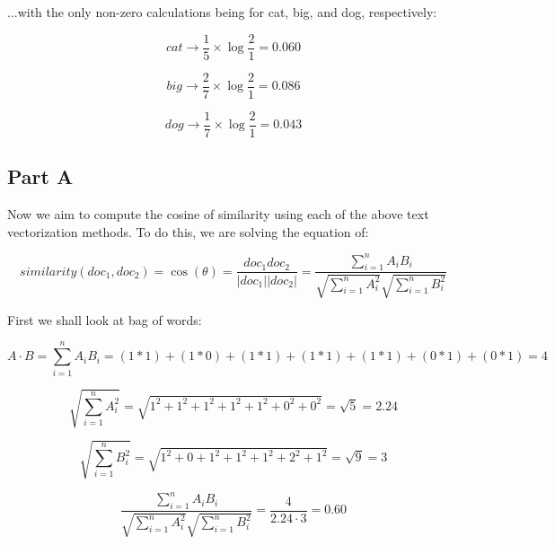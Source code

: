\documentclass{article}
\begin{document}
\noindent ...with the only non-zero calculations being for cat, big, and dog, respectively:

\begin{equation}
    cat \rightarrow \frac{1}{5} \times \log{\frac{2}{1}} = 0.060
\end{equation}

\begin{equation}
    big \rightarrow \frac{2}{7} \times \log{\frac{2}{1}} = 0.086
\end{equation}

\begin{equation}
    dog \rightarrow \frac{1}{7} \times \log{\frac{2}{1}} = 0.043
\end{equation}

\subsection*{Part A}

Now we aim to compute the cosine of similarity using each of the above text vectorization methods. To do this, we are solving the equation of:

\begin{equation}
    similarity(doc_1, doc_2) = \cos(\theta) = \frac{doc_1 doc_2}{\lvert doc_1 \rvert \lvert doc_2 \rvert} = \frac{\sum^n_{i=1} A_i B_i}{\sqrt{\sum^{n}_{i=1} A^2_i} \sqrt{\sum^n_{i=1} B^2_i}}
\end{equation}

\noindent First we shall look at bag of words:

\begin{equation}
    A \cdot B = \sum^n_{i=1} A_i B_i = (1*1) + (1*0) + (1*1) + (1*1) + (1*1) + (0*1) + (0*1) = 4
\end{equation}

\begin{equation}
    \sqrt{\sum^n_{i=1} A_i^2 } = \sqrt{1^2 + 1^2 + 1^2 + 1^2 + 1^2 + 0^2 + 0^2} = \sqrt{5} = 2.24
\end{equation}

\begin{equation}
    \sqrt{\sum^n_{i=1} B_i^2 } = \sqrt{1^2 + 0 + 1^2 + 1^2 + 1^2 + 2^2 + 1^2} = \sqrt{9} = 3
\end{equation}

\begin{equation}
    \frac{\sum^n_{i=1} A_i B_i}{\sqrt{\sum^{n}_{i=1} A^2_i} \sqrt{\sum^n_{i=1} B^2_i}} = \frac{4}{2.24 \cdot 3} = 0.60
\end{equation}
\end{document}
